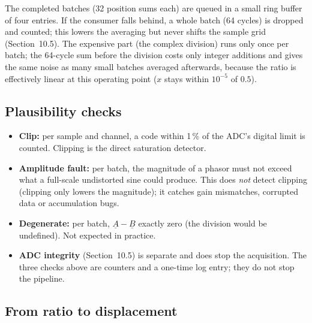 \documentclass[11pt,a4paper]{article}
\begin{document}
The completed batches (32 position sums each) are queued in a small ring buffer
of four entries.  If the consumer falls behind, a whole batch (64 cycles) is
dropped and counted; this lowers the averaging but never shifts the sample grid
(Section~10.5).  The expensive part (the complex division) runs only once per
batch; the 64-cycle sum before the division costs only integer additions and
gives the same noise as many small batches averaged afterwards, because the
ratio is effectively linear at this operating point ($x$ stays within
$10^{-5}$ of $0.5$).

\subsection{Plausibility checks}

\begin{itemize}
  \item \textbf{Clip:} per sample and channel, a code within 1\,\% of the
        ADC's digital limit is counted.  Clipping is the direct saturation
        detector.
  \item \textbf{Amplitude fault:} per batch, the magnitude of a phasor must
        not exceed what a full-scale undistorted sine could produce.  This
        does \emph{not} detect clipping (clipping only lowers the
        magnitude); it catches gain mismatches, corrupted data or
        accumulation bugs.
  \item \textbf{Degenerate:} per batch, $\underline{A}-\underline{B}$
        exactly zero (the division would be undefined).  Not expected in
        practice.
  \item \textbf{ADC integrity} (Section~10.5) is separate and does stop the
        acquisition.  The three checks above are counters and a one-time log
        entry; they do not stop the pipeline.
\end{itemize}

\subsection{From ratio to displacement}
\label{sec:ratio2disp}
\end{document}
